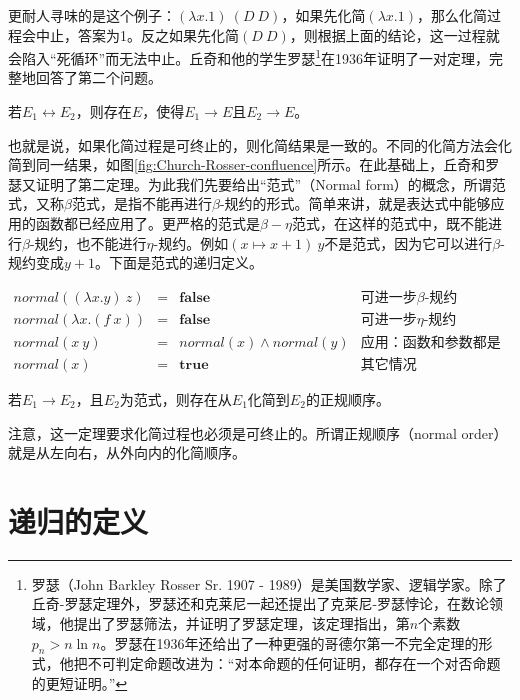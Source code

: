 \documentclass[UTF8]{article}
\begin{document}
更耐人寻味的是这个例子：$(\lambda x . 1)\ (D\ D)$，如果先化简$(\lambda x . 1)$，那么化简过程会中止，答案为1。反之如果先化简$(D\ D)$，则根据上面的结论，这一过程就会陷入“死循环”而无法中止。丘奇和他的学生罗瑟\footnote{罗瑟（John Barkley Rosser Sr. 1907 - 1989）是美国数学家、逻辑学家。除了丘奇-罗瑟定理外，罗瑟还和克莱尼一起还提出了克莱尼-罗瑟悖论，在数论领域，他提出了罗瑟筛法，并证明了罗瑟定理，该定理指出，第$n$个素数$p_n > n \ln n$。罗瑟在1936年还给出了一种更强的哥德尔第一不完全定理的形式，他把不可判定命题改进为：“对本命题的任何证明，都存在一个对否命题的更短证明。”}在1936年证明了一对定理，完整地回答了第二个问题。

\begin{theorem}[丘奇-罗瑟定理一]
若$E_1 \leftrightarrow E_2$，则存在$E$，使得$E_1 \to E$且$E_2 \to E$。
\end{theorem}

也就是说，如果化简过程是可终止的，则化简结果是一致的。不同的化简方法会化简到同一结果，如图\ref{fig:Church-Rosser-confluence}所示。在此基础上，丘奇和罗瑟又证明了第二定理。为此我们先要给出“范式”（Normal form）的概念，所谓范式，又称$\beta$范式，是指不能再进行$\beta$-规约的形式。简单来讲，就是表达式中能够应用的函数都已经应用了。更严格的范式是$\beta-\eta$范式，在这样的范式中，既不能进行$\beta$-规约，也不能进行$\eta$-规约。例如$(x \mapsto x + 1)\ y$不是范式，因为它可以进行$\beta$-规约变成$y + 1$。下面是范式的递归定义。

\[
\begin{array}{rcll}
normal((\lambda x . y)\ z) & = & \textbf{false} & \text{可进一步$\beta$-规约} \\
normal(\lambda x . (f\ x)) & = & \textbf{false} & \text{可进一步$\eta$-规约} \\
normal(x\ y) & = & normal(x) \land normal(y) & \text{应用：函数和参数都是范式} \\
normal(x) & = & \textbf{true} & \text{其它情况}
\end{array}
\]

\begin{theorem}[丘奇-罗瑟定理二]
若$E_1 \to E_2$，且$E_2$为范式，则存在从$E_1$化简到$E_2$的正规顺序。
\end{theorem}

注意，这一定理要求化简过程也必须是可终止的。所谓正规顺序（normal order）就是从左向右，从外向内的化简顺序。

\section{递归的定义}
\end{document}
